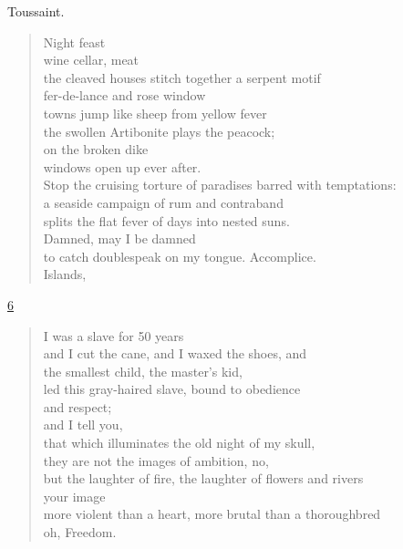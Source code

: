 \documentclass[letterpaper,article,12pt,oneside,notitlepage]{memoir}
\begin{document}
\begin{center}Toussaint.\end{center}

\begin{verse}
Night feast \\
wine cellar, meat \\
the cleaved houses stitch together a serpent motif \\
fer-de-lance and rose window \\
towns jump like sheep from yellow fever \\
the swollen Artibonite plays the peacock; \\
on the broken dike \\
windows open up ever after. \\
Stop the cruising torture of paradises barred with temptations: \\
a seaside campaign of rum and contraband \\
splits the flat fever of days into nested suns. \\
Damned, may I be damned \\
to catch doublespeak on my tongue. Accomplice. \\
Islands, \\
\end{verse}

\clearpage

\href{http://cesaire.elotroalex.com/chiens/chiens/p006.html}{6}

\begin{verse}
I was a slave for 50 years \\
and I cut the cane, and I waxed the shoes, and \\
the smallest child, the master's kid, \\
led this gray-haired slave, bound to obedience \\
and respect; \\
and I tell you, \\
that which illuminates the old night of my skull, \\
they are not the images of ambition, no, \\
but the laughter of fire, the laughter of flowers and rivers \\
your image \\
more violent than a heart, more brutal than a thoroughbred \\
oh, Freedom. \\
\end{verse}
\end{document}
